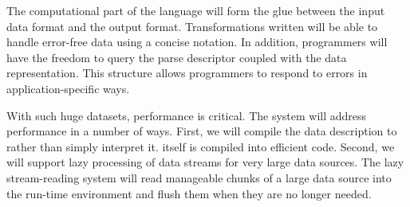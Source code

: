 \documentclass[11pt]{article}
\begin{document}
The computational part of the \datatype{} language will form the glue between
the input data format and the output format.  Transformations written
\datatype{} will be able to handle error-free data using a concise 
notation.  In addition, programmers will have the freedom to
query the parse descriptor coupled with the data representation. 
This structure allows programmers
to respond to errors in application-specific ways.

With such huge datasets, performance is critical. The \datatype{}
system will address performance in a number of ways.  First, we will
compile the data description to \pads{} rather than simply interpret
it. \pads{} itself is compiled into efficient \C{} code.  Second, we
will support lazy processing of data streams for very large data
sources.  The lazy stream-reading system will read manageable chunks
of a large data source into the run-time environment and flush them
when they are no longer needed.  


\end{document}
